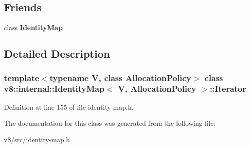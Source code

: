 \subsection*{Friends}
\begin{DoxyCompactItemize}
\item 
\mbox{\label{classv8_1_1internal_1_1IdentityMap_1_1Iterator_ae590404335e213a16caa66d971da9f15}} 
class {\bfseries Identity\+Map}
\end{DoxyCompactItemize}


\subsection{Detailed Description}
\subsubsection*{template$<$typename V, class Allocation\+Policy$>$\newline
class v8\+::internal\+::\+Identity\+Map$<$ V, Allocation\+Policy $>$\+::\+Iterator}



Definition at line 155 of file identity-\/map.\+h.



The documentation for this class was generated from the following file\+:\begin{DoxyCompactItemize}
\item 
v8/src/identity-\/map.\+h\end{DoxyCompactItemize}
